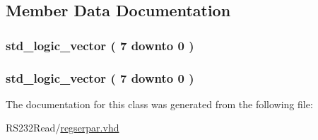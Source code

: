 \subsection{Member Data Documentation}
\hypertarget{class_reg_ser_par_1_1simple_ad10a4e4c76feecd3a8553e7fa1d63a6f}{}
\subsubsection[{Qn}]{ {\bfseries \textcolor{comment}{std\+\_\+logic\+\_\+vector}\textcolor{vhdlchar}{ }\textcolor{vhdlchar}{(}\textcolor{vhdlchar}{ }\textcolor{vhdlchar}{ } \textcolor{vhdldigit}{7} \textcolor{vhdlchar}{ }\textcolor{keywordflow}{downto}\textcolor{vhdlchar}{ }\textcolor{vhdlchar}{ } \textcolor{vhdldigit}{0} \textcolor{vhdlchar}{ }\textcolor{vhdlchar}{)}\textcolor{vhdlchar}{ }} \hspace{0.3cm}{\ttfamily [Signal]}}\label{class_reg_ser_par_1_1simple_ad10a4e4c76feecd3a8553e7fa1d63a6f}
\hypertarget{class_reg_ser_par_1_1simple_a85d3dc48bd9eeb0e6c914f3706ba9015}{}
\subsubsection[{Qp}]{ {\bfseries \textcolor{comment}{std\+\_\+logic\+\_\+vector}\textcolor{vhdlchar}{ }\textcolor{vhdlchar}{(}\textcolor{vhdlchar}{ }\textcolor{vhdlchar}{ } \textcolor{vhdldigit}{7} \textcolor{vhdlchar}{ }\textcolor{keywordflow}{downto}\textcolor{vhdlchar}{ }\textcolor{vhdlchar}{ } \textcolor{vhdldigit}{0} \textcolor{vhdlchar}{ }\textcolor{vhdlchar}{)}\textcolor{vhdlchar}{ }} \hspace{0.3cm}{\ttfamily [Signal]}}\label{class_reg_ser_par_1_1simple_a85d3dc48bd9eeb0e6c914f3706ba9015}


The documentation for this class was generated from the following file\+:\begin{DoxyCompactItemize}
\item 
R\+S232\+Read/\hyperlink{regserpar_8vhd}{regserpar.\+vhd}\end{DoxyCompactItemize}
